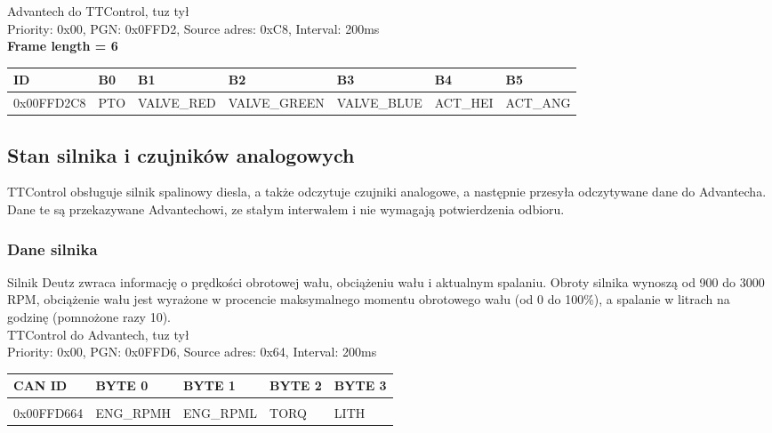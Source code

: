 \documentclass{article}
\begin{document}
Advantech do TTControl, tuz tył\\
Priority: 0x00, PGN: 0x0FFD2, Source adres: 0xC8, Interval: 200ms\\
\textbf{Frame length = 6}
\begin{center}
\begin{tabular}{| p{65pt} | p{30pt} | p{70pt} | p{70pt} | p{75pt} | p{40pt} | p{40pt} |}
    \hline 
    ID & B0 & B1 & B2 & B3 & B4 & B5 \\ 
    \hline
    0x00FFD2C8 & PTO & VALVE\_RED & VALVE\_GREEN & VALVE\_BLUE & ACT\_HEI & ACT\_ANG \\
    \hline
\end{tabular}
\end{center}

\subsection{Stan silnika i czujników analogowych}
TTControl obsługuje silnik spalinowy diesla, a także odczytuje czujniki analogowe, a następnie przesyła odczytywane dane do Advantecha. Dane te są przekazywane Advantechowi, ze stałym interwałem i nie wymagają potwierdzenia odbioru.

\subsubsection{Dane silnika}
Silnik Deutz zwraca informację o prędkości obrotowej wału, obciążeniu wału i aktualnym spalaniu. Obroty silnika wynoszą od 900 do 3000 RPM, obciążenie wału jest wyrażone w procencie maksymalnego momentu obrotowego wału (od 0 do 100\%), a spalanie w litrach na godzinę (pomnożone razy 10).\\

TTControl do Advantech, tuz tył\\
Priority: 0x00, PGN: 0x0FFD6, Source adres: 0x64, Interval: 200ms\\
\begin{left}
\begin{tabular}{ |p{2cm}|p{1.9cm}|p{1.9cm}|p{1.9cm}|p{1.9cm}|} 
 \hline
 CAN ID & BYTE 0 & BYTE 1 & BYTE 2 & BYTE 3  \\ \hline
 & & & & \\
0x00FFD664 & ENG\_RPMH & ENG\_RPML & TORQ & LITH \\
 \hline
\end{tabular}
\end{left}\\
\end{document}

